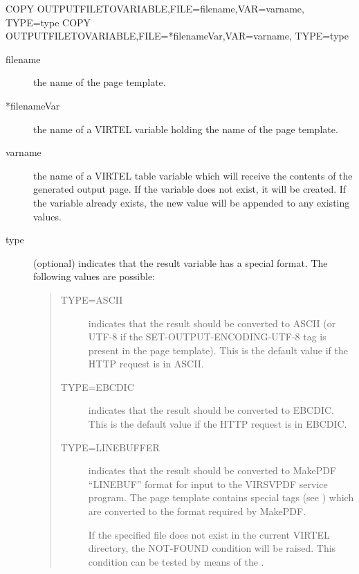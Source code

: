 \documentclass[letterpaper,10pt,english]{sphinxmanual}
\begin{document}
\begin{sphinxVerbatim}[commandchars=\\\{\}]
COPY\PYGZdl{} OUTPUT\PYGZhy{}FILE\PYGZhy{}TO\PYGZhy{}VARIABLE,FILE=\PYGZsq{}filename\PYGZsq{},VAR=\PYGZsq{}varname\PYGZsq{},
    TYPE=type
COPY\PYGZdl{} OUTPUT\PYGZhy{}FILE\PYGZhy{}TO\PYGZhy{}VARIABLE,FILE=\PYGZsq{}*filenameVar\PYGZsq{},VAR=\PYGZsq{}varname\PYGZsq{},
    TYPE=type
\end{sphinxVerbatim}
\begin{description}
\item[{filename}] \leavevmode
the name of the page template.

\item[{*filenameVar}] \leavevmode
the name of a VIRTEL variable holding the name of the page template.

\item[{varname}] \leavevmode
the name of a VIRTEL table variable which will receive the contents of the generated output page. If the variable does not exist, it will be created. If the variable already exists, the new value will be appended to any existing values.

\item[{type}] \leavevmode
(optional) indicates that the result variable has a special format. The following values are possible:
\begin{quote}
\begin{description}
\item[{TYPE=ASCII}] \leavevmode
indicates that the result should be converted to ASCII (or UTF-8 if the SET-OUTPUT-ENCODING-UTF-8 tag is present in the page template). This is the default value if the HTTP request is in ASCII.

\item[{TYPE=EBCDIC}] \leavevmode
indicates that the result should be converted to EBCDIC. This is the default value if the HTTP request is in EBCDIC.

\item[{TYPE=LINEBUFFER}] \leavevmode
indicates that the result should be converted to MakePDF “LINEBUF” format for input to the VIRSVPDF service program. The page template contains special tags (see {\hyperref[\detokenize{User_Guide:v457ug-pdf-output}]{}}) which are converted to the format required by MakePDF.

If the specified file does not exist in the current VIRTEL directory, the NOT-FOUND condition will be raised. This condition can be tested by means of the {\hyperref[\detokenize{User_Guide:v457ug-if}]{}}.

\end{description}
\end{quote}

\end{description}
\end{document}
